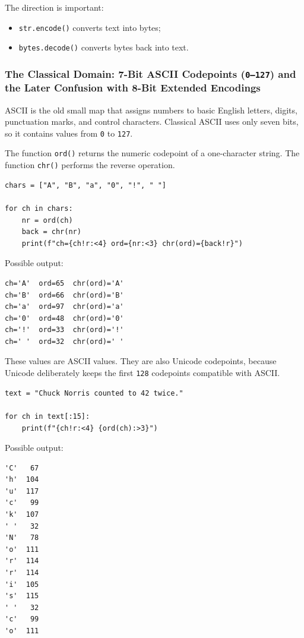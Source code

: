 The direction is important:

\begin{itemize}
    \item \texttt{str.encode()} converts text into bytes;
    \item \texttt{bytes.decode()} converts bytes back into text.
\end{itemize}

\subsubsection{The Classical Domain: 7-Bit ASCII Codepoints (\texttt{0--127}) and the Later Confusion with 8-Bit Extended Encodings}

ASCII is the old small map that assigns numbers to basic English letters, digits, punctuation marks, and control characters. Classical ASCII uses only seven bits, so it contains values from \texttt{0} to \texttt{127}.

The function \texttt{ord()} returns the numeric codepoint of a one-character string. The function \texttt{chr()} performs the reverse operation.

\begin{verbatim}
chars = ["A", "B", "a", "0", "!", " "]

for ch in chars:
    nr = ord(ch)
    back = chr(nr)
    print(f"ch={ch!r:<4} ord={nr:<3} chr(ord)={back!r}")
\end{verbatim}

Possible output:

\begin{verbatim}
ch='A'  ord=65  chr(ord)='A'
ch='B'  ord=66  chr(ord)='B'
ch='a'  ord=97  chr(ord)='a'
ch='0'  ord=48  chr(ord)='0'
ch='!'  ord=33  chr(ord)='!'
ch=' '  ord=32  chr(ord)=' '
\end{verbatim}

These values are ASCII values. They are also Unicode codepoints, because Unicode deliberately keeps the first \texttt{128} codepoints compatible with ASCII.

\begin{verbatim}
text = "Chuck Norris counted to 42 twice."

for ch in text[:15]:
    print(f"{ch!r:<4} {ord(ch):>3}")
\end{verbatim}

Possible output:

\begin{verbatim}
'C'   67
'h'  104
'u'  117
'c'   99
'k'  107
' '   32
'N'   78
'o'  111
'r'  114
'r'  114
'i'  105
's'  115
' '   32
'c'   99
'o'  111
\end{verbatim}

